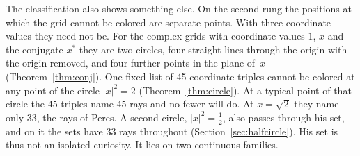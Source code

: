 The classification also shows something else.  On the second rung the positions at which
the grid cannot be colored are separate points.  With three coordinate values they need not
be.  For the complex grids with coordinate values $1$, $x$ and the conjugate $x^{*}$ they are
two circles, four straight lines through the origin with the origin removed, and four further
points in the plane of~$x$ (Theorem~\ref{thm:conj}).  One fixed list of 45 coordinate triples
cannot be colored at any point of the circle $|x|^2=2$ (Theorem~\ref{thm:circle}).  At a
typical point of that circle the 45 triples name 45 rays and no fewer will do.  At $x=\sqrt2$
they name only 33, the rays of Peres.  A second circle, $|x|^2=\tfrac12$, also passes through
his set, and on it the sets have 33 rays throughout (Section~\ref{sec:halfcircle}).  His set
is thus not an isolated curiosity.  It lies on two continuous families.
